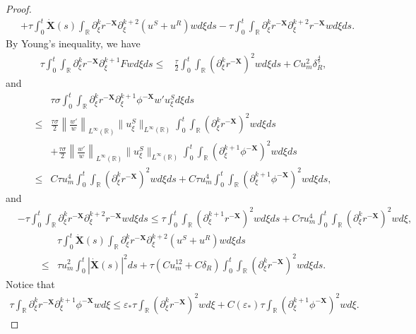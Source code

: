 \documentclass[10pt,reqno]{amsart}
\numberwithin{equation}{section}
\begin{document}
\begin{proof}
\begin{align*}
			&+\tau\int_0^t\dot{\mathbf{X}}(s)\int_{\mathbb{R}}\partial_{\xi}^kr^{-\mathbf{X}}\partial_{\xi}^{k+2}(u^S+u^R)wd\xi ds-\tau\int_0^t\int_{\mathbb{R}}\partial_{\xi}^kr^{-\mathbf{X}}\partial_{\xi}^{k+2}r^{-\mathbf{X}}wd\xi ds.
		\end{align*} 
		By Young's inequality, we have
		\begin{align*}
			\tau\int_0^t\int_{\mathbb{R}}\partial_{\xi}^kr^{-\mathbf{X}}\partial_{\xi}^{k+1}Fwd\xi ds
			\leq&\frac{\tau}{2}\int_{0}^t\int_{\mathbb{R}}(\partial_{\xi}^kr^{-\mathbf{X}})^2wd\xi ds+Cu_m^2\delta_R^{\frac{4}{7}},
		\end{align*}
		and
		\begin{align*}
			&\tau\sigma\int_{0}^t\int_{\mathbb{R}}\partial_{\xi}^kr^{-\mathbf{X}}\partial_{\xi}^{k+1}\phi^{-\mathbf{X}}w'u^S_{\xi}d\xi ds\\
			\leq&\frac{\tau\sigma}{2}\left\lVert\frac{w'}{w}\right\rVert_{L^{\infty}(\mathbb{R})}\|u^S_{\xi}\|_{L^{\infty}(\mathbb{R})}\int_{0}^t\int_{\mathbb{R}}(\partial_{\xi}^kr^{-\mathbf{X}})^2wd\xi ds\\
			&+\frac{\tau\sigma}{2}\left\lVert\frac{w'}{w}\right\rVert_{L^{\infty}(\mathbb{R})}\|u^S_{\xi}\|_{L^{\infty}(\mathbb{R})}\int_{0}^t\int_{\mathbb{R}}(\partial_{\xi}^{k+1}\phi^{-\mathbf{X}})^2wd\xi ds\\
			\leq&C\tau u_m^4\int_{0}^t\int_{\mathbb{R}}(\partial_{\xi}^kr^{-\mathbf{X}})^2wd\xi ds+C\tau u_m^4\int_{0}^t\int_{\mathbb{R}}(\partial_{\xi}^{k+1}\phi^{-\mathbf{X}})^2wd\xi ds,
		\end{align*}
		and
		\begin{align*}
			&-\tau\int_0^t\int_{\mathbb{R}}\partial_{\xi}^kr^{-\mathbf{X}}\partial_{\xi}^{k+2}r^{-\mathbf{X}}wd\xi ds\leq\tau\int_{0}^t\int_{\mathbb{R}}(\partial_{\xi}^{k+1}r^{-\mathbf{X}})^2wd\xi ds+C\tau u_m^4\int_0^t\int_{\mathbb{R}}(\partial_{\xi}^kr^{-\mathbf{X}})^2wd\xi,
		\end{align*}
		\begin{align*}
			&\tau\int_0^t\dot{\mathbf{X}}(s)\int_{\mathbb{R}}\partial_{\xi}^kr^{-\mathbf{X}}\partial_{\xi}^{k+2}(u^S+u^R)wd\xi ds\\
			\leq&\tau u_m^2\int_{0}^t\left|\dot{\mathbf{X}}(s)\right|^2ds+\tau\left(Cu_m^{12}+C\delta_R\right)\int_{0}^t\int_{\mathbb{R}}(\partial_{\xi}^kr^{-\mathbf{X}})^2wd\xi ds.
		\end{align*}
		Notice that 
		\begin{align*}
			\tau\int_{\mathbb{R}}\partial_{\xi}^kr^{-\mathbf{X}}\partial_{\xi}^{k+1}\phi^{-\mathbf{X}}wd\xi\leq \varepsilon_*\tau\int_{\mathbb{R}}(\partial_{\xi}^kr^{-\mathbf{X}})^2wd\xi+C(\varepsilon_*)\tau\int_{\mathbb{R}}(\partial_{\xi}^{k+1}\phi^{-\mathbf{X}})^2wd\xi.

\end{align*}
\end{proof}
\end{document}
